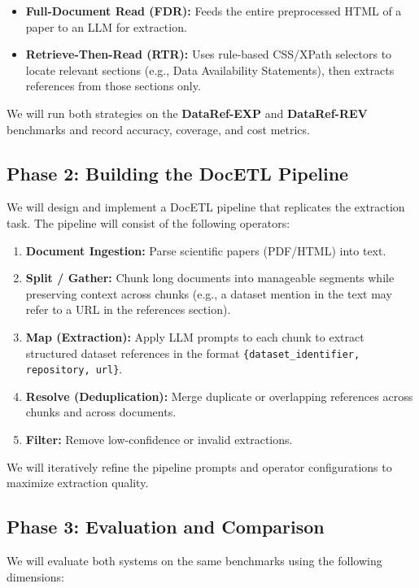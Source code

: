 \documentclass[11pt]{article}
\begin{document}
\begin{itemize}[nosep]
    \item \textbf{Full-Document Read (FDR):} Feeds the entire preprocessed HTML of a paper to an LLM for extraction.
    \item \textbf{Retrieve-Then-Read (RTR):} Uses rule-based CSS/XPath selectors to locate relevant sections (e.g., Data Availability Statements), then extracts references from those sections only.
\end{itemize}

We will run both strategies on the \textbf{DataRef-EXP} and \textbf{DataRef-REV} benchmarks and record accuracy, coverage, and cost metrics.

\subsection{Phase 2: Building the DocETL Pipeline}

We will design and implement a DocETL pipeline that replicates the extraction task. The pipeline will consist of the following operators:

\begin{enumerate}[nosep]
    \item \textbf{Document Ingestion:} Parse scientific papers (PDF/HTML) into text.
    \item \textbf{Split / Gather:} Chunk long documents into manageable segments while preserving context across chunks (e.g., a dataset mention in the text may refer to a URL in the references section).
    \item \textbf{Map (Extraction):} Apply LLM prompts to each chunk to extract structured dataset references in the format \texttt{\{dataset\_identifier, repository, url\}}.
    \item \textbf{Resolve (Deduplication):} Merge duplicate or overlapping references across chunks and across documents.
    \item \textbf{Filter:} Remove low-confidence or invalid extractions.
\end{enumerate}

We will iteratively refine the pipeline prompts and operator configurations to maximize extraction quality.

\subsection{Phase 3: Evaluation and Comparison}

We will evaluate both systems on the same benchmarks using the following dimensions:
\end{document}
